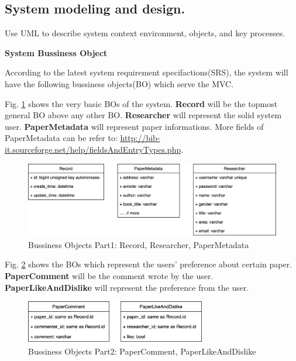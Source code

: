 \subsection{System modeling and design.}
Use UML to describe system context environment, objects, and key processes.

\textbf{System Bussiness Object}

According to the latest system requirement specifactions(SRS), 
the system will have the following bussiness objects(BO) which serve the MVC.

Fig. \ref{fig:bo_classes_1} shows the very basic BOs of the system. 
\textbf{Record} will be the topmost general BO above any other BO.
\textbf{Researcher} will represent the solid system user.
\textbf{PaperMetadata} will represent paper informations. 
More fields of PaperMetadata can be refer to:
\url{http://bib-it.sourceforge.net/help/fieldsAndEntryTypes.php}.


\begin{figure}[t]
	\centering
	\includegraphics[width=\textwidth]{./img/bo_classes_1.png}
	\caption{Bussiness Objects Part1: Record, Researcher, PaperMetadata}
	
	\label{fig:bo_classes_1}
\end{figure}


Fig. \ref{fig:bo_classes_2} shows the BOs which represent the users' preference about certain paper. 
\textbf{PaperComment} will be the comment wrote by the user.
\textbf{PaperLikeAndDislike} will represent the preference from the user.

\begin{figure}[t]
	\centering
	\includegraphics[width=0.7\textwidth]{./img/bo_classes_2.png}
	\caption{Bussiness Objects Part2: PaperComment, PaperLikeAndDislike}
	
	\label{fig:bo_classes_2}
\end{figure}

